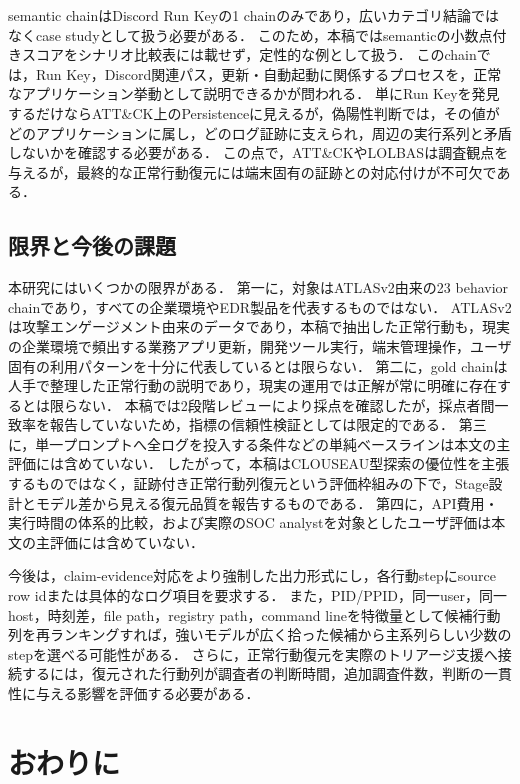 \documentclass[a4paper,twocolumn,10pt]{article}
\begin{document}
semantic chainはDiscord Run Keyの1 chainのみであり，広いカテゴリ結論ではなくcase studyとして扱う必要がある．
このため，本稿ではsemanticの小数点付きスコアをシナリオ比較表には載せず，定性的な例として扱う．
このchainでは，Run Key，Discord関連パス，更新・自動起動に関係するプロセスを，正常なアプリケーション挙動として説明できるかが問われる．
単にRun Keyを発見するだけならATT\&CK上のPersistenceに見えるが，偽陽性判断では，その値がどのアプリケーションに属し，どのログ証跡に支えられ，周辺の実行系列と矛盾しないかを確認する必要がある．
この点で，ATT\&CKやLOLBASは調査観点を与えるが，最終的な正常行動復元には端末固有の証跡との対応付けが不可欠である．

\subsection{限界と今後の課題}

本研究にはいくつかの限界がある．
第一に，対象はATLASv2由来の23 behavior chainであり，すべての企業環境やEDR製品を代表するものではない．
ATLASv2は攻撃エンゲージメント由来のデータであり，本稿で抽出した正常行動も，現実の企業環境で頻出する業務アプリ更新，開発ツール実行，端末管理操作，ユーザ固有の利用パターンを十分に代表しているとは限らない．
第二に，gold chainは人手で整理した正常行動の説明であり，現実の運用では正解が常に明確に存在するとは限らない．
本稿では2段階レビューにより採点を確認したが，採点者間一致率を報告していないため，指標の信頼性検証としては限定的である．
第三に，単一プロンプトへ全ログを投入する条件などの単純ベースラインは本文の主評価には含めていない．
したがって，本稿はCLOUSEAU型探索の優位性を主張するものではなく，証跡付き正常行動列復元という評価枠組みの下で，Stage設計とモデル差から見える復元品質を報告するものである．
第四に，API費用・実行時間の体系的比較，および実際のSOC analystを対象としたユーザ評価は本文の主評価には含めていない．

今後は，claim-evidence対応をより強制した出力形式にし，各行動stepにsource row idまたは具体的なログ項目を要求する．
また，PID/PPID，同一user，同一host，時刻差，file path，registry path，command lineを特徴量として候補行動列を再ランキングすれば，強いモデルが広く拾った候補から主系列らしい少数のstepを選べる可能性がある．
さらに，正常行動復元を実際のトリアージ支援へ接続するには，復元された行動列が調査者の判断時間，追加調査件数，判断の一貫性に与える影響を評価する必要がある．

\section{おわりに}
\end{document}
